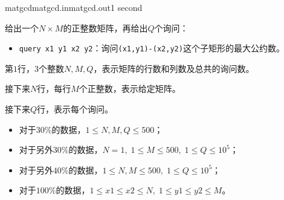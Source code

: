 \documentclass[11pt,a4paper,oneside]{article}
\begin{document}
\begin{problem}{matgcd}{matgcd.in}{matgcd.out}{1 second}
	
	给出一个$N \times M$的正整数矩阵，再给出$Q$个询问：
	\begin{itemize}
		\item \texttt{query x1 y1 x2 y2}：询问\texttt{(x1,y1)-(x2,y2)}这个子矩形的最大公约数。
	\end{itemize}
	
	\InputFile
	
	第$1$行，$3$个整数$N, M, Q$，表示矩阵的行数和列数及总共的询问数。
	
	接下来$N$行，每行$M$个正整数，表示给定矩阵。
	
	接下来$Q$行，表示每个询问。
	
	\OutputFile
	
	\Example
	
	\begin{example}
\end{example}

\Note
\begin{itemize}
	\item 对于$30\%$的数据，$1 \leq N, M, Q \leq 500$；
	\item 对于另外$30\%$的数据，$N = 1, \; 1 \leq M \leq 500, \; 1 \leq Q \leq 10^5$；
	\item 对于另外$40\%$的数据，$1 \leq N, M \leq 500, \; 1 \leq Q \leq 10^5$；
	\item 对于$100\%$的数据，$1 \leq x1 \leq x2 \leq N, \; 1 \leq y1 \leq y2 \leq M$。
\end{itemize}

\end{problem}
\end{document}
